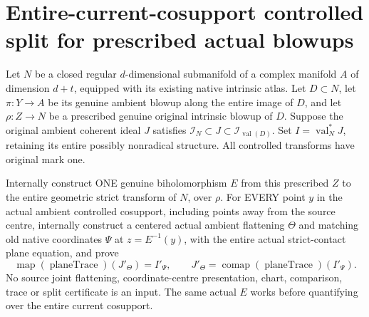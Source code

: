 \section{Entire-current-cosupport controlled split for prescribed actual blowups}

\begin{theorem}
\label{hir:disjoint-actual-global-controlled-split}
\leanok
Let $N$ be a closed regular $d$-dimensional submanifold of a complex manifold
$A$ of dimension $d+t$, equipped with its existing native intrinsic atlas.
Let $D\subset N$, let $\pi:Y\to A$ be its genuine ambient blowup along the
entire image of $D$, and let $\rho:Z\to N$ be a prescribed genuine original
intrinsic blowup of $D$. Suppose the original ambient coherent ideal $J$
satisfies $\mathcal I_N\subset J\subset\mathcal I_{\operatorname{val}(D)}$.
Set $I=\operatorname{val}_N^*J$, retaining its entire possibly nonradical
structure. All controlled transforms have original mark one.

Internally construct ONE genuine biholomorphism $E$ from this prescribed $Z$
to the entire geometric strict transform of $N$, over $\rho$. For EVERY
point $y$ in the actual ambient controlled cosupport, including points away
from the source centre, internally construct a centered actual ambient
flattening $\Theta$ and matching old native coordinates $\Psi$ at
$z=E^{-1}(y)$, with the entire actual strict-contact plane equation, and prove
\[
 \operatorname{map}(\operatorname{planeTrace})(J'_\Theta)=I'_\Psi,
 \qquad
 J'_\Theta=\operatorname{comap}(\operatorname{planeTrace})(I'_\Psi).
\]
No source joint flattening, coordinate-centre presentation, chart, comparison,
trace or split certificate is an input. The same actual $E$ works before
quantifying over the entire current cosupport.
\end{theorem}
